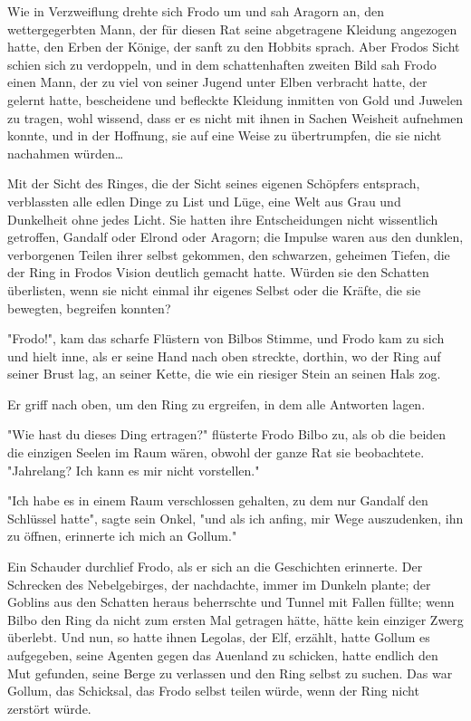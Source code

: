 {Wie in Verzweiflung drehte sich Frodo um und sah Aragorn an, den wettergegerbten Mann, der für diesen Rat seine abgetragene Kleidung angezogen hatte, den Erben der Könige, der sanft zu den Hobbits sprach. Aber Frodos Sicht schien sich zu verdoppeln, und in dem schattenhaften zweiten Bild sah Frodo einen Mann, der zu viel von seiner Jugend unter Elben verbracht hatte, der gelernt hatte, bescheidene und befleckte Kleidung inmitten von Gold und Juwelen zu tragen, wohl wissend, dass er es nicht mit ihnen in Sachen Weisheit aufnehmen konnte, und in der Hoffnung, sie auf eine Weise zu übertrumpfen, die sie nicht nachahmen würden…

Mit der Sicht des Ringes, die der Sicht seines eigenen Schöpfers entsprach, verblassten alle edlen Dinge zu List und Lüge, eine Welt aus Grau und Dunkelheit ohne jedes Licht. Sie hatten ihre Entscheidungen nicht wissentlich getroffen, Gandalf oder Elrond oder Aragorn; die Impulse waren aus den dunklen, verborgenen Teilen ihrer selbst gekommen, den schwarzen, geheimen Tiefen, die der Ring in Frodos Vision deutlich gemacht hatte. Würden sie den Schatten überlisten, wenn sie nicht einmal ihr eigenes Selbst oder die Kräfte, die sie bewegten, begreifen konnten?

"Frodo!", kam das scharfe Flüstern von Bilbos Stimme, und Frodo kam zu sich und hielt inne, als er seine Hand nach oben streckte, dorthin, wo der Ring auf seiner Brust lag, an seiner Kette, die wie ein riesiger Stein an seinen Hals zog.

Er griff nach oben, um den Ring zu ergreifen, in dem alle Antworten lagen.

"Wie hast du dieses Ding ertragen?" flüsterte Frodo Bilbo zu, als ob die beiden die einzigen Seelen im Raum wären, obwohl der ganze Rat sie beobachtete. "Jahrelang? Ich kann es mir nicht vorstellen."

"Ich habe es in einem Raum verschlossen gehalten, zu dem nur Gandalf den Schlüssel hatte", sagte sein Onkel, "und als ich anfing, mir Wege auszudenken, ihn zu öffnen, erinnerte ich mich an Gollum."

Ein Schauder durchlief Frodo, als er sich an die Geschichten erinnerte. Der Schrecken des Nebelgebirges, der nachdachte, immer im Dunkeln plante; der Goblins aus den Schatten heraus beherrschte und Tunnel mit Fallen füllte; wenn Bilbo den Ring da nicht zum ersten Mal getragen hätte, hätte kein einziger Zwerg überlebt. Und nun, so hatte ihnen Legolas, der Elf, erzählt, hatte Gollum es aufgegeben, seine Agenten gegen das Auenland zu schicken, hatte endlich den Mut gefunden, seine Berge zu verlassen und den Ring selbst zu suchen. Das war Gollum, das Schicksal, das Frodo selbst teilen würde, wenn der Ring nicht zerstört würde.

}
